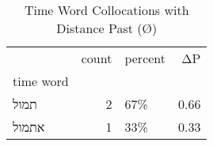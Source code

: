 \begin{table}[htbp!]
\centering
\caption{Time Word Collocations with Distance Past (Ø)}
\label{table:distpastØ_head_cpd}
\begin{tabular}{lrlr}
\toprule
{} &  count & percent &    ΔP \\
time word &        &         &       \\
\midrule
תמול      &      2 &     67\% &  0.66 \\
אתמול     &      1 &     33\% &  0.33 \\
\bottomrule
\end{tabular}
\end{table}
